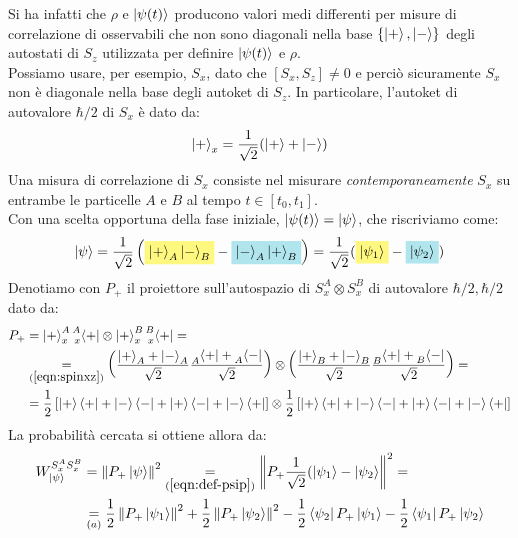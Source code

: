 \documentclass[../../FisicaTeorica.tex]{subfiles}
\begin{document}
Si ha infatti che $\rho$ e $\Ket{\psi(t)}$ producono valori medi differenti per misure di correlazione di osservabili che non sono diagonali nella base $\{\Ket{+},\Ket{-}\}$ degli autostati di $S_z$ utilizzata per definire $\Ket{\psi(t)}$ e $\rho$.\\
Possiamo usare, per esempio, $S_x$, dato che $[S_x, S_z] \neq 0$ e perciò sicuramente $S_x$ non è diagonale nella base degli autoket di $S_z$. In particolare, l'autoket di autovalore $\hbar/2$ di $S_x$ è dato da:
\begin{align}
\Ket{+}_x = \frac{1}{\sqrt{2}}(\Ket{+}+\Ket{-})
\label{eqn:spinxz}
\end{align}
Una misura di correlazione di $S_x$ consiste nel misurare \textit{contemporaneamente} $S_x$ su entrambe le particelle $A$ e $B$ al tempo $t \in [t_0, t_1]$.\\
Con una scelta opportuna della fase iniziale, $\Ket{\psi(t)}=\Ket{\psi}$, che riscriviamo come:
\begin{align}
\ket{\psi} = \frac{1}{\sqrt{2}}\left(\hlc{Yellow}{\ket{+}_A\ket{-}_B }- \hlc{SkyBlue}{\ket{-}_A\ket{+}_B}\right) = \frac{1}{\sqrt{2}}(\hlc{Yellow}{\ket{\psi_1}}-\hlc{SkyBlue}{\ket{\psi_2}})
\label{eqn:def-psip}
\end{align}
Denotiamo con $P_+$ il proiettore sull'autospazio di $S_x^A \otimes S_x^B$ di autovalore $\hbar/2, \hbar/2$ dato da:
\begin{align*}
P_+ &= \Ket{+}_x^A \prescript{A}{x}{\Bra{+}} \otimes \Ket{+}_x^B \prescript{B}{x}{\Bra{+}} =\\
&\underset{(\ref{eqn:spinxz})}{=} \left(\frac{\Ket{+}_A+\Ket{-}_A}{\sqrt{2}}\frac{\prescript{}{A}{\Bra{+}+\prescript{}{A}{\Bra{-}}}}{\sqrt{2}}
\right) \otimes
\left(
\frac{\Ket{+}_B + \Ket{-}_B}{\sqrt{2}}\frac{\prescript{}{B}{\Bra{+}+\prescript{}{B}{\Bra{-}}}}{\sqrt{2}}
\right) =\\
&= \frac{1}{2}\left[\Ket{+}\Bra{+}+\Ket{-}\Bra{-}+\Ket{+}\Bra{-}+\Ket{-}\Bra{+}\right] \otimes \frac{1}{2}\left[\Ket{+}\Bra{+}+\Ket{-}\Bra{-}+\Ket{+}\Bra{-}+\Ket{-}\Bra{+}\right]
\end{align*}
La probabilità cercata si ottiene allora da:
\begin{align} \nonumber
W_{\Ket{\psi}}^{S_x^A S_x^B} &= \left\lVert P_+ \Ket{\psi}\right\rVert^2 \underset{(\ref{eqn:def-psip})}{=} \left\lVert P_+ \frac{1}{\sqrt{2}}(\Ket{\psi_1} - \Ket{\psi_2} \right\rVert^2 =\\
&\underset{(a)}{=} \frac{1}{2}\left\lVert P_+ \Ket{\psi_1}\right\rVert^2 + \frac{1}{2}\left\lVert P_+ \Ket{\psi_2}\right\rVert^2 - \frac{1}{2}\Bra{\psi_2}P_+ \Ket{\psi_1}-\frac{1}{2}\Bra{\psi_1}P_+\Ket{\psi_2} \label{eqn:prob-p}
\end{align}
\end{document}
